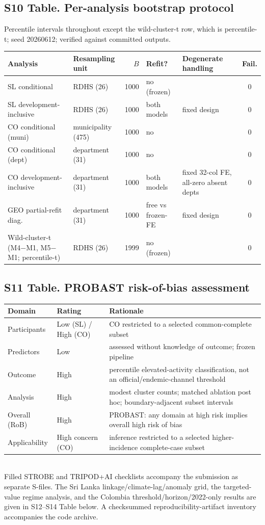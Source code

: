 \documentclass[11pt,a4paper]{article}
\begin{document}
\subsection*{S10 Table. Per-analysis bootstrap protocol}
\noindent Percentile intervals throughout except the wild-cluster-t row, which is percentile-t; seed 20260612; verified against committed outputs.\\[0.3em]
\begin{tabularx}{\textwidth}{@{}XlrlXc@{}}
\toprule
Analysis & Resampling unit & $B$ & Refit? & Degenerate handling & Fail. \\
\midrule
SL conditional & RDHS (26) & 1000 & no (frozen) & & 0 \\
SL development-inclusive & RDHS (26) & 1000 & both models & fixed design & 0 \\
CO conditional (muni) & municipality (475) & 1000 & no & & 0 \\
CO conditional (dept) & department (31) & 1000 & no & & 0 \\
CO development-inclusive & department (31) & 1000 & both models & fixed 32-col FE, all-zero absent depts & 0 \\
GEO partial-refit diag.\ & department (31) & 1000 & free vs frozen-FE & fixed design & 0 \\
Wild-cluster-t (M4$-$M1, M5$-$M1; percentile-t) & RDHS (26) & 1999 & no (frozen) & & 0 \\
\bottomrule
\end{tabularx}

\subsection*{S11 Table. PROBAST risk-of-bias assessment}
\begin{tabularx}{\textwidth}{@{}llX@{}}
\toprule
Domain & Rating & Rationale \\
\midrule
Participants & Low (SL) / High (CO) & CO restricted to a selected common-complete subset \\
Predictors & Low & assessed without knowledge of outcome; frozen pipeline \\
Outcome & High & percentile elevated-activity classification, not an official/endemic-channel threshold \\
Analysis & High & modest cluster counts; matched ablation post hoc; boundary-adjacent subset intervals \\
\midrule
Overall (RoB) & High & PROBAST: any domain at high risk implies overall high risk of bias \\
Applicability & High concern (CO) & inference restricted to a selected higher-incidence complete-case subset \\
\bottomrule
\end{tabularx}\\[0.2em]
\noindent Filled STROBE and TRIPOD+AI checklists accompany the submission as
separate S-files. The Sri Lanka linkage/climate-lag/anomaly grid, the targeted-value
regime analysis, and the Colombia threshold/horizon/2022-only results are given in
S12--S14 Table below. A checksummed reproducibility-artifact inventory accompanies the
code archive.
\end{document}
